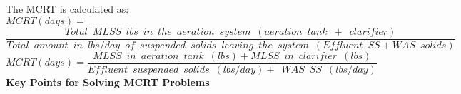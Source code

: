 The MCRT is calculated as:\\  
\vspace{0.2cm}
$MCRT(days) = $\\
$\dfrac{Total \enspace MLSS \enspace lbs \enspace in \enspace the \enspace aeration \enspace system \enspace (aeration \enspace tank \enspace + \enspace clarifier)}{Total \enspace amount \enspace in \enspace lbs/day \enspace of \enspace suspended \enspace solids \enspace leaving  \enspace the \enspace system \enspace(Effluent\enspace SS+ WAS \enspace solids)}$\\
\vspace{0.4cm} 
$MCRT (days) = \dfrac{MLSS \enspace in \enspace aeration \enspace tank \enspace (lbs)+MLSS \enspace in \enspace clarifier \enspace (lbs)}{Effluent \enspace suspended \enspace solids \enspace (lbs/day)+\enspace WAS \enspace SS \enspace (lbs/day)}$\\
\vspace{0.3cm}
\textbf{Key Points for Solving MCRT Problems}\\
